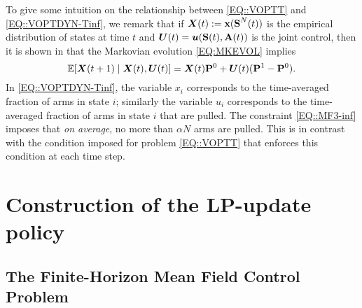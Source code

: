 To give some intuition on the relationship between \eqref{EQ::VOPTT} and \eqref{EQ::VOPTDYN-Tinf}, we remark that if ${\bm{X}(t)} := \textbf{x}(\textbf{S}^{N}(t))$ is the empirical distribution of states at time $t$ and $\bm{U}(t)=\bm{u}(\textbf{S}(t),\textbf{A}(t))$ is the joint control, then it is shown in \citet{GGY23b} that the Markovian evolution \eqref{EQ:MKEVOL} implies
\begin{equation}
\mathbb{E}[{\bm{X}(t + 1)} \mid {\bm{X}(t)}, \bm{U}(t)] = {\bm{X}}{(t)}  \mathbf{P}^{0} +  \bm{U}(t)(\mathbf{P}^{1} - \mathbf{P}^{0}).
\label{EQ:evolution_mf}
\end{equation}
In \eqref{EQ::VOPTDYN-Tinf}, the variable $x_i$ corresponds to the time-averaged fraction of arms in state $i$; similarly the variable $u_i$ corresponds to the time-averaged fraction of arms in state $i$ that are pulled. The constraint \eqref{EQ::MF3-inf} imposes that \emph{on average}, no more than $\alpha N$ arms are pulled. This is in contrast with the condition imposed for problem \eqref{EQ::VOPTT} that enforces this condition at each time step. 





\section{Construction of the LP-update policy}
\label{sec:algo}

\subsection{The Finite-Horizon Mean Field Control Problem}

